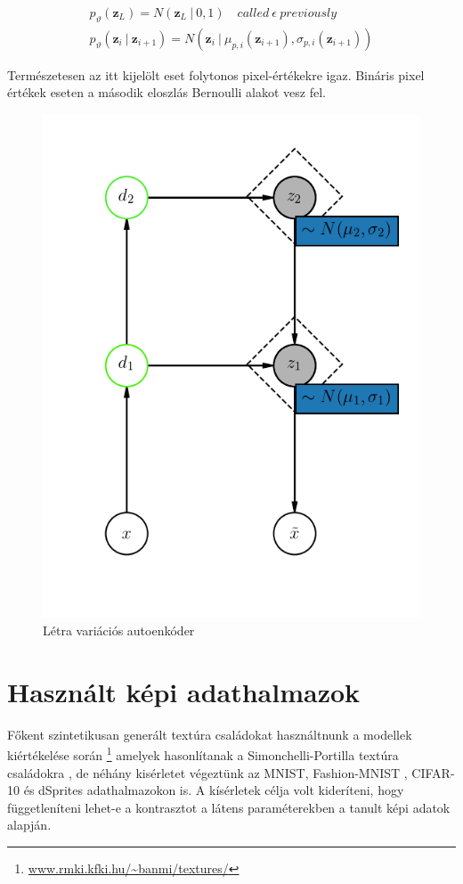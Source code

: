 \documentclass[12pt, english]{article}
\begin{document}
\vspace{4mm}

\begin{gather*}
    p_{\vartheta}(\bm{z}_L) = N(\bm{z}_L  ~ | ~ 0, 1) \quad called\ \epsilon\ previously\\
    p_{\vartheta}(\bm{z}_i ~ | ~ \bm{z}_{i+1}) = N(\bm{z}_i ~ |  ~ \mu_{p,i}(\bm{z}_{i+1}), \sigma_{p, i}(\bm{z}_{i+1}))
\end{gather*}

\vspace{4mm}

\par Természetesen az itt kijelölt eset folytonos pixel-értékekre igaz. Bináris pixel értékek eseten a második eloszlás Bernoulli alakot vesz fel.

\vspace{4mm}

\begin{figure}[H]
    \centering
    \includegraphics[width=0.35\linewidth]{lvae.png}
    \caption{Létra variációs autoenkóder}
\end{figure}

\newpage

\section{Használt képi adathalmazok}

\vspace{7mm}

\par Főkent szintetikusan generált textúra családokat használtnunk a modellek kiértékelése során \footnote{\url{www.rmki.kfki.hu/~banmi/textures/}} amelyek hasonlítanak a  Simonchelli-Portilla textúra családokra \cite{portilla2003image}, de néhány kisérletet végeztünk az MNIST, Fashion-MNIST \cite{xiao2017fashion}, CIFAR-10 és dSprites adathalmazokon \cite{matthey2017dsprites} is. A kísérletek célja volt kideríteni, hogy függetleníteni lehet-e a kontrasztot a látens paraméterekben a tanult képi adatok alapján.
\end{document}
